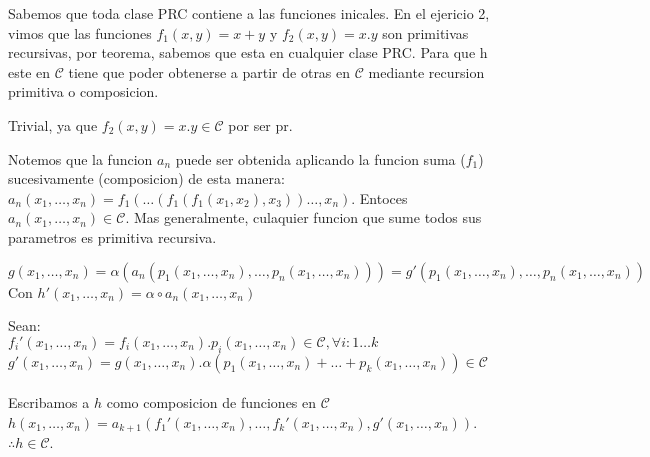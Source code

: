 \documentclass{report}
\begin{document}
Sabemos que toda clase PRC contiene a las funciones inicales. En el ejericio 2, vimos que las funciones $f_1(x,y) = x+y$ y $f_2(x,y) = x.y$ son primitivas recursivas, por teorema, sabemos que esta en cualquier clase PRC.
Para que h este en $\mathcal{C}$ tiene que poder obtenerse a partir de otras en $\mathcal{C}$ mediante recursion primitiva o composicion.


\begin{myproof}
	Trivial, ya que $f_2(x,y) = x.y \in \mathcal{C}$ por ser pr.
\end{myproof}


\begin{myproof}
	Notemos que la funcion $a_n$  puede ser obtenida aplicando la funcion suma ($f_1$) sucesivamente (composicion) de esta manera:
	$a_n(x_1,\ldots,x_n)=f_1(\ldots(f_1(f_1(x_1,x_2),x_3))\ldots,x_n)$. Entoces $ a_n(x_1,\ldots,x_n)\in \mathcal{C}$. Mas generalmente, culaquier funcion que sume todos sus parametros
	es primitiva recursiva.
\end{myproof}


\begin{myproof}
	$g(x_1, \ldots , x_n) = \alpha(a_n(p_1(x_1, \ldots , x_n), \ldots, p_n(x_1, \ldots , x_n))) = g'(p_1(x_1, \ldots , x_n), \ldots, p_n(x_1, \ldots , x_n))$
	\\Con $h'(x_1, \ldots , x_n) = \alpha \circ a_n (x_1, \ldots , x_n)$
\end{myproof}


\begin{myproof}
	Sean: \\ $f_i'(x_1,\ldots,x_n) = f_i(x_1,\ldots,x_n).p_i(x_1,\ldots,x_n) \in \mathcal{C} , \forall i: 1 \ldots k$
	\\ $g'(x_1,\ldots,x_n) = g(x_1,\ldots,x_n).\alpha(p_1(x_1,\ldots,x_n)+\ldots+p_k(x_1,\ldots,x_n)) \in \mathcal{C}$
	\\\\ Escribamos a $h$ como composicion de funciones en $\mathcal{C}$ \\
	$h(x_1,\ldots,x_n) = a_{k+1}(f_1'(x_1,\ldots,x_n), \ldots,f_k'(x_1,\ldots,x_n), g'(x_1,\ldots,x_n))$. \\$\therefore h \in \mathcal{C}$. 
	

\end{myproof}
\end{document}
